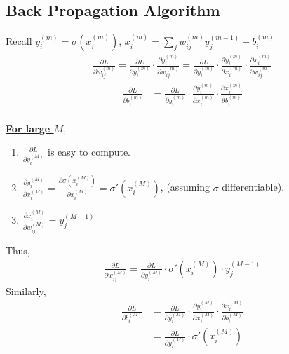 \documentclass[11pt,a4paper]{article}
\begin{document}
\subsection{Back Propagation Algorithm}
Recall $y_i^{(m)}=\sigma(x_i^{(m)})$, $x_i^{(m)}=\sum_jw_{ij}^{(m)}y_j^{(m-1)}+b_i^{(m)}$
\begin{equation}
    \begin{aligned}
        \frac{\partial L}{\partial w_{ij}^{(m)}}=\frac{\partial L}{\partial y_i^{(m)}}\cdot \frac{\partial y_i^{(m)}}{\partial w_{ij}^{(m)}}=\frac{\partial L}{\partial y_i^{(m)}}\cdot \frac{\partial y_i^{(m)}}{\partial x_{i}^{(m)}}\cdot \frac{\partial x_{i}^{(m)}}{\partial w_{ij}^{(m)}}
    \end{aligned}
    \nonumber
\end{equation}
\begin{equation}
    \begin{aligned}
        \frac{\partial L}{\partial b_{i}^{(m)}}&=\frac{\partial L}{\partial y_i^{(m)}}\cdot \frac{\partial y_i^{(m)}}{\partial x_{i}^{(m)}}\cdot \frac{\partial x_{i}^{(m)}}{\partial b_{i}^{(m)}}\\
    \end{aligned}
    \nonumber
\end{equation}

\textbf{\underline{For large $M$}},
\begin{enumerate}[$\bullet$]
    \item $\frac{\partial L}{\partial y_i^{(M)}}$ is easy to compute.
    \item $\frac{\partial y_i^{(M)}}{\partial x_{i}^{(M)}}=\frac{\partial \sigma(x_{i}^{(M)})}{\partial x_{i}^{(M)}}=\sigma'(x_{i}^{(M)})$, (assuming $\sigma$ differentiable).
    \item $\frac{\partial x_{i}^{(M)}}{\partial w_{ij}^{(M)}}=y_j^{(M-1)}$
\end{enumerate}
Thus,
\begin{equation}
    \begin{aligned}
        \frac{\partial L}{\partial w_{ij}^{(M)}}=\frac{\partial L}{\partial y_i^{(M)}}\cdot \sigma'(x_{i}^{(M)}) \cdot y_j^{(M-1)}
    \end{aligned}
    \nonumber
\end{equation}
Similarly,
\begin{equation}
    \begin{aligned}
        \frac{\partial L}{\partial b_{i}^{(M)}}&=\frac{\partial L}{\partial y_i^{(M)}}\cdot \frac{\partial y_i^{(M)}}{\partial x_{i}^{(M)}}\cdot \frac{\partial x_{i}^{(M)}}{\partial b_{i}^{(M)}}\\
        &=\frac{\partial L}{\partial y_i^{(M)}}\cdot \sigma'(x_{i}^{(M)})
    \end{aligned}
    \nonumber
\end{equation}
\end{document}
